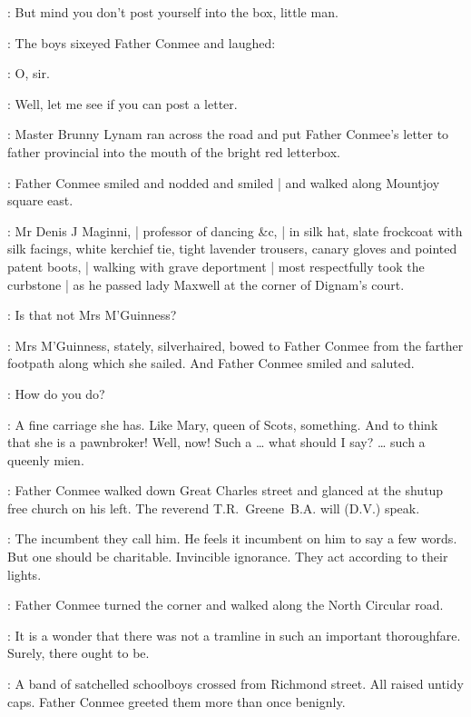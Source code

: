 \conmee:
But mind you don't post yourself into the box, little man.

:
The boys sixeyed Father Conmee and laughed:

\Boys:
O, sir.

\conmee:
Well, let me see if you can post a letter.

:
Master Brunny Lynam ran across the road
and put Father Conmee's letter to father provincial
into the mouth of the bright red letterbox.

:
Father Conmee smiled and nodded and smiled |
and walked along Mountjoy square east.

\begin{interject}
    :
    Mr Denis J Maginni, |
    professor of dancing \&c, |
    in silk hat,
    slate frockcoat with silk facings,
    white kerchief tie,
    tight lavender trousers,
    canary gloves
    and pointed patent boots, |
    walking with grave deportment |
    most respectfully took the curbstone |
    as he passed lady Maxwell
    at the corner of Dignam's court.
\end{interject}

\conmeeint:
Is that not Mrs M'Guinness?

:
Mrs M'Guinness,
stately, silverhaired,
bowed to Father Conmee from the farther footpath
along which she sailed.
And Father Conmee smiled and saluted.

\conmee:
How do you do?

\conmeeint:
A fine carriage she has.
Like Mary, queen of Scots, something.
And to think that she is a pawnbroker!
Well, now!
Such a \ldots
what should I say? \ldots
such a queenly mien.

:
Father Conmee walked down Great Charles street
and glanced at the shutup free church on his left.
The reverend T.R.~Greene~B.A. will (D.V.) speak.

\conmeeint:
The incumbent they call him.
He feels it incumbent on him to say a few words.
But one should be charitable.
Invincible ignorance.
They act according to their lights.

:
Father Conmee turned the corner
and walked along the North Circular road.

\conmeeint:
It is a wonder that there was not a tramline
in such an important thoroughfare.
Surely, there ought to be.

:
A band of satchelled schoolboys crossed from Richmond street.
All raised untidy caps.
Father Conmee greeted them more than once benignly.

